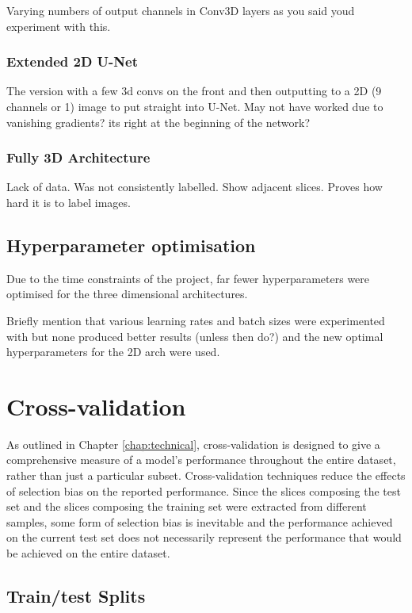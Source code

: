 Varying numbers of output channels in Conv3D layers as you said youd experiment with this.

\subsubsection{Extended 2D U-Net}

The version with a few 3d convs on the front and then outputting to a 2D (9 channels or 1) image to put straight into U-Net. May not have worked due to vanishing gradients? its right at the beginning of the network?

\subsubsection{Fully 3D Architecture}

Lack of data. Was not consistently labelled. Show adjacent slices. Proves how hard it is to label images.

\subsection{Hyperparameter optimisation}

Due to the time constraints of the project, far fewer hyperparameters were optimised for the three dimensional architectures.

Briefly mention that various learning rates and batch sizes were experimented with but none produced better results (unless then do?) and the new optimal hyperparameters for the 2D arch were used.

\section{Cross-validation}
\label{sec:evalcrossval}

As outlined in Chapter \ref{chap:technical}, cross-validation is designed to give a comprehensive measure of a model's performance throughout the entire dataset, rather than just a particular subset. Cross-validation techniques reduce the effects of selection bias on the reported performance. Since the slices composing the test set and the slices composing the training set were extracted from different samples, some form of selection bias is inevitable and the performance achieved on the current test set does not necessarily represent the performance that would be achieved on the entire dataset.

\subsection{Train/test Splits}

